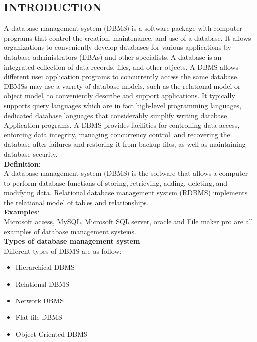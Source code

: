 \documentclass[14pt]{article} %
\begin{document}
\subsection{INTRODUCTION}
A database management system (DBMS) is a software package with computer programs that control the creation, maintenance, and use of a database. It allows organizations to conveniently develop databases for various applications by database administrators (DBAs) and other specialists. A database is an integrated collection of data records, files, and other objects. A DBMS allows different user application programs to concurrently access the same database. DBMSs may use a variety of database models, such as the relational model or object model, to conveniently describe and support applications. It typically supports query languages which are in fact high-level programming languages, dedicated database languages that considerably simplify writing database Application programs.  A DBMS provides facilities for controlling data access, enforcing data integrity, managing concurrency control, and recovering the database after failures and restoring it from backup files, as well as maintaining database security.
\\
\newline
 \textbf{Definition:}
\\A database management system (DBMS) is the software that allows a computer to perform database functions of storing, retrieving, adding, deleting, and modifying data. Relational database management system (RDBMS) implements the relational model of tables and relationships.
\\
\newline
 \textbf{Examples:}
\\Microsoft access, MySQL, Microsoft SQL server, oracle and File maker pro are all examples of database management systems.
\\
\newline
 \textbf{Types of database management system}
  \\Different types of DBMS are as follow:
 \begin{itemize}
\item	Hierarchical DBMS  
\item	Relational DBMS
\item	Network DBMS
\item	Flat file DBMS
\item	 Object Oriented DBMS        
\end{itemize}
\end{document}
